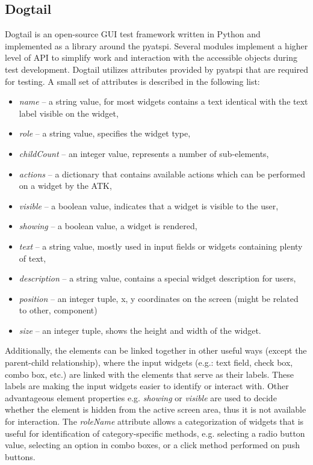 \subsection{Dogtail}\label{sniff_accerciser}
Dogtail is an open-source GUI test framework written in Python and implemented as a library around the pyatspi. Several modules implement a higher level of API to simplify work and interaction with the accessible objects during test development. Dogtail utilizes attributes provided by pyatspi that are required for testing. A small set of attributes is described in the following list:
\begin{itemize}
    \item \textit{name} -- a string value, for most widgets contains a text identical with the text label visible on the widget,
    \item \textit{role} -- a string value, specifies the widget type,
    \item \textit{childCount} -- an integer value, represents a number of sub-elements,
    \item \textit{actions} -- a dictionary that contains available actions which can be performed on a widget by the ATK,
    \item \textit{visible} -- a boolean value, indicates that a widget is visible to the user,
    \item \textit{showing} -- a boolean value, a widget is rendered,
    \item \textit{text} -- a string value, mostly used in input fields or widgets containing plenty of text,
    \item \textit{description} -- a string value, contains a special widget description for users,
    \item \textit{position} -- an integer tuple, x, y coordinates on the screen (might be related to other, component)
    \item \textit{size} -- an integer tuple, shows the height and width of the widget.
\end{itemize}

Additionally, the elements can be linked together in other useful ways (except the parent-child relationship), where the input widgets (e.g.: text field, check box, combo box, etc.) are linked with the elements that serve as their labels. These labels are making the input widgets easier to identify or interact with. Other advantageous element properties e.g. \textit{showing} or \textit{visible} are used to decide whether the element is hidden from the active screen area, thus it is not available for interaction. The \textit{roleName} attribute allows a categorization of widgets that is useful for identification of category-specific methods, e.g. selecting a radio button value, selecting an option in combo boxes, or a click method performed on push buttons. 

